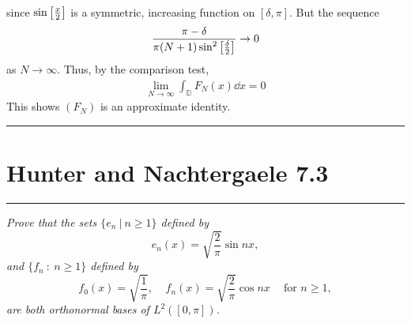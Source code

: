 \documentclass[fontsize=11pt]{article} %
\theoremstyle{plain}
\numberwithin{equation}{section} %
\numberwithin{figure}{section} %
\numberwithin{table}{section} %
\begin{document}
\begin{enumerate}[\bf (a)]
\begin{align*}
        \end{align*}
        since $\sin\qty[\frac{x}{2}]$ is a symmetric, increasing function on $[\delta, \pi]$.  But the sequence
        \begin{align*}
            \frac{\pi - \delta}{\pi(N+1)\sin^2\qty[\frac{\delta}{2}]} \rightarrow 0
        \end{align*}
        as $N \rightarrow \infty$.  Thus, by the comparison test,
        \begin{align*}
            \lim_{N\rightarrow\infty}\int_\mathbb{D}F_N(x)\dd x = 0
        \end{align*}
        This shows $(F_N)$ is an approximate identity.
\end{enumerate}

\begin{center}
    \noindent\rule{5cm}{1pt}
\end{center}
\section{\bf Hunter and Nachtergaele 7.3}
\begin{center}
    \noindent\rule{5cm}{1pt}
\end{center}

\emph{Prove that the sets $\{e_n\ |\ n \geq 1\}$ defined by $$e_n(x) = \sqrt{\frac{2}{\pi}}\sin nx,$$ and $\{f_n\ :\ n \geq 1\}$ defined by $$f_0(x) = \sqrt{\frac{1}{\pi}},\ \ \ \ \ f_n(x) = \sqrt{\frac{2}{\pi}}\cos nx\ \ \ \ \text{ for } n \geq 1,$$ are both orthonormal bases of $L^2([0,\pi])$.} \\
\end{document}
